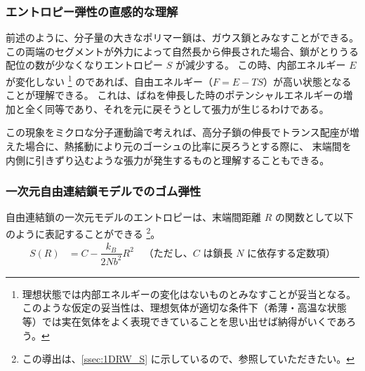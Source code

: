 \documentclass[uplatex,dvipdfmx,a4paper,11pt, titlepage]{jsarticle}
\begin{document}

\subsubsection{エントロピー弾性の直感的な理解}

前述のように、分子量の大きなポリマー鎖は、ガウス鎖とみなすことができる。
この両端のセグメントが外力によって自然長から伸長された場合、鎖がとりうる配位の数が少なくなりエントロピー $S$ が減少する。
この時、内部エネルギー $E$ が変化しない
\footnote
{
理想状態では内部エネルギーの変化はないものとみなすことが妥当となる。
このような仮定の妥当性は、理想気体が適切な条件下（希薄・高温な状態等）では実在気体をよく表現できていることを思い出せば納得がいくであろう。
}
のであれば、自由エネルギー（$F=E-TS$）が高い状態となることが理解できる。
これは、ばねを伸長した時のポテンシャルエネルギーの増加と全く同等であり、それを元に戻そうとして張力が生じるわけである。

この現象をミクロな分子運動論で考えれば、高分子鎖の伸長でトランス配座が増えた場合に、熱搖動により元のゴーシュの比率に戻ろうとする際に、
末端間を内側に引きずり込むような張力が発生するものと理解することもできる。

\subsubsection{一次元自由連結鎖モデルでのゴム弾性}

自由連結鎖の一次元モデルのエントロピーは、末端間距離 $R$ の関数として以下のように表記することができる
\footnote
{
この導出は、\ref{ssec:1DRW_S} に示しているので、参照していただきたい。
}。
\begin{align*}
S(R)
	&= C -\dfrac{ k_B}{2Nb^2}R^2 \quad \text{（ただし、$C$ は鎖長 $N$ に依存する定数項）}
\end{align*}
\end{document}
